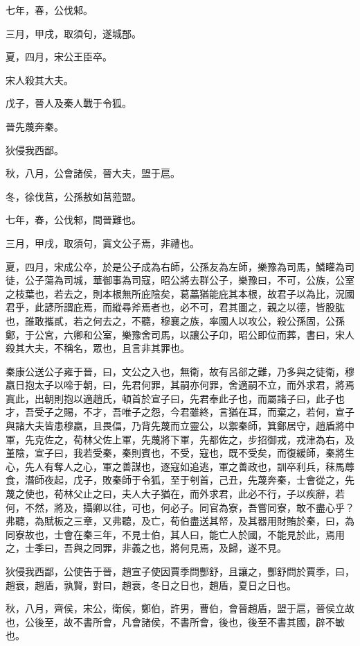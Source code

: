 \begin{pinyinscope}
七年，春，公伐邾。

三月，甲戌，取須句，遂城郚。

夏，四月，宋公王臣卒。

宋人殺其大夫。

戊子，晉人及秦人戰于令狐。

晉先蔑奔秦。

狄侵我西鄙。

秋，八月，公會諸侯，晉大夫，盟于扈。

冬，徐伐莒，公孫敖如莒蒞盟。

七年，春，公伐邾，間晉難也。

三月，甲戌，取須句，寘文公子焉，非禮也。

夏，四月，宋成公卒，於是公子成為右師，公孫友為左師，樂豫為司馬，鱗矔為司徒，公子蕩為司城，華御事為司寇，昭公將去群公子，樂豫曰，不可，公族，公室之枝葉也，若去之，則本根無所庇陰矣，葛藟猶能庇其本根，故君子以為比，況國君乎，此諺所謂庇焉，而縱尋斧焉者也，必不可，君其圖之，親之以德，皆股肱也，誰敢攜貳，若之何去之，不聽，穆襄之族，率國人以攻公，殺公孫固，公孫鄭，于公宮，六卿和公室，樂豫舍司馬，以讓公子卬，昭公即位而葬，書曰，宋人殺其大夫，不稱名，眾也，且言非其罪也。

秦康公送公子雍于晉，曰，文公之入也，無衛，故有呂郤之難，乃多與之徒衛，穆嬴日抱太子以啼于朝，曰，先君何罪，其嗣亦何罪，舍適嗣不立，而外求君，將焉寘此，出朝則抱以適趙氏，頓首於宣子曰，先君奉此子也，而屬諸子曰，此子也才，吾受子之賜，不才，吾唯子之怨，今君雖終，言猶在耳，而棄之，若何，宣子與諸大夫皆患穆嬴，且畏偪，乃背先蔑而立靈公，以禦秦師，箕鄭居守，趙盾將中軍，先克佐之，荀林父佐上軍，先蔑將下軍，先都佐之，步招御戎，戎津為右，及堇陰，宣子曰，我若受秦，秦則賓也，不受，寇也，既不受矣，而復緩師，秦將生心，先人有奪人之心，軍之善謀也，逐寇如追逃，軍之善政也，訓卒利兵，秣馬蓐食，潛師夜起，戊子，敗秦師于令狐，至于刳首，己丑，先蔑奔秦，士會從之，先蔑之使也，荀林父止之曰，夫人大子猶在，而外求君，此必不行，子以疾辭，若何，不然，將及，攝卿以往，可也，何必子。同官為寮，吾嘗同寮，敢不盡心乎？弗聽，為賦板之三章，又弗聽，及亡，荀伯盡送其帑，及其器用財賄於秦，曰，為同寮故也，士會在秦三年，不見士伯，其人曰，能亡人於國，不能見於此，焉用之，士季曰，吾與之同罪，非義之也，將何見焉，及歸，遂不見。

狄侵我西鄙，公使告于晉，趙宣子使因賈季問酆舒，且讓之，酆舒問於賈季，曰，趙衰，趙盾，孰賢，對曰，趙衰，冬日之日也，趙盾，夏日之日也。

秋，八月，齊侯，宋公，衛侯，鄭伯，許男，曹伯，會晉趙盾，盟于扈，晉侯立故也，公後至，故不書所會，凡會諸侯，不書所會，後也，後至不書其國，辟不敏也。


\end{pinyinscope}
